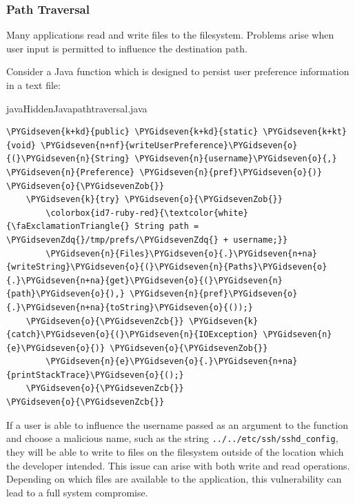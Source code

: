 \subsubsection{Path Traversal}

Many applications read and write files to the filesystem.
Problems arise when user input is permitted to influence the destination path.

Consider a Java function which is designed to persist user preference information in a text file:

\newsavebox\myvb
\begin{lrbox}{\myvb}\begin{minipage}{\textwidth}
\begin{mycodefile}{java}{Hidden}{Java}{pathtraversal.java}\end{mycodefile}
\end{minipage}\end{lrbox}

\begin{mdframed}
\begin{Verbatim}[commandchars=\\\{\}]
\PYGidseven{k+kd}{public} \PYGidseven{k+kd}{static} \PYGidseven{k+kt}{void} \PYGidseven{n+nf}{writeUserPreference}\PYGidseven{o}{(}\PYGidseven{n}{String} \PYGidseven{n}{username}\PYGidseven{o}{,} \PYGidseven{n}{Preference} \PYGidseven{n}{pref}\PYGidseven{o}{)} \PYGidseven{o}{\PYGidsevenZob{}}
    \PYGidseven{k}{try} \PYGidseven{o}{\PYGidsevenZob{}}
        \colorbox{id7-ruby-red}{\textcolor{white}{\faExclamationTriangle{} String path = \PYGidsevenZdq{}/tmp/prefs/\PYGidsevenZdq{} + username;}}
        \PYGidseven{n}{Files}\PYGidseven{o}{.}\PYGidseven{n+na}{writeString}\PYGidseven{o}{(}\PYGidseven{n}{Paths}\PYGidseven{o}{.}\PYGidseven{n+na}{get}\PYGidseven{o}{(}\PYGidseven{n}{path}\PYGidseven{o}{),} \PYGidseven{n}{pref}\PYGidseven{o}{.}\PYGidseven{n+na}{toString}\PYGidseven{o}{());}
    \PYGidseven{o}{\PYGidsevenZcb{}} \PYGidseven{k}{catch}\PYGidseven{o}{(}\PYGidseven{n}{IOException} \PYGidseven{n}{e}\PYGidseven{o}{)} \PYGidseven{o}{\PYGidsevenZob{}}
        \PYGidseven{n}{e}\PYGidseven{o}{.}\PYGidseven{n+na}{printStackTrace}\PYGidseven{o}{();}
    \PYGidseven{o}{\PYGidsevenZcb{}}
\PYGidseven{o}{\PYGidsevenZcb{}}
\end{Verbatim}
\end{mdframed}

If a user is able to influence the username passed as an argument to the function and choose a malicious name, such as
the string \texttt{../../etc/ssh/sshd_config}, they will be able to write to files on the filesystem outside of the
location which the developer intended.
This issue can arise with both write and read operations.
Depending on which files are available to the application, this vulnerability can lead to a full system compromise.

